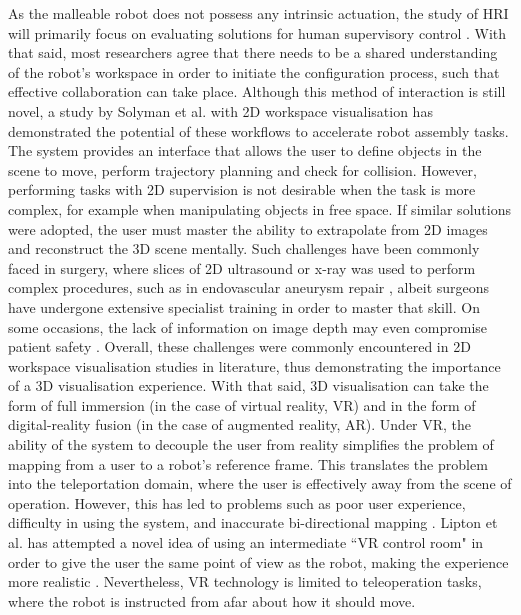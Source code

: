 As the malleable robot does not possess any intrinsic actuation, the study of HRI will primarily focus on evaluating solutions for human supervisory control \cite{sheridan2016human}. With that said, most researchers agree that there needs to be a shared understanding of the robot's workspace in order to initiate the configuration process, such that effective collaboration can take place. Although this method of interaction is still novel, a study by Solyman et al. \cite{solyman2020perceptive} with 2D workspace visualisation has demonstrated the potential of these workflows to accelerate robot assembly tasks. The system provides an interface that allows the user to define objects in the scene to move, perform trajectory planning and check for collision.  However, performing tasks with 2D supervision is not desirable when the task is more complex, for example when manipulating objects in free space. If similar solutions were adopted, the user must master the ability to extrapolate from 2D images and reconstruct the 3D scene mentally. Such challenges have been commonly faced in surgery, where slices of 2D ultrasound or x-ray was used to perform complex procedures, such as in endovascular aneurysm repair \cite{doelare2021image}, albeit surgeons have undergone extensive specialist training in order to master that skill. On some occasions, the lack of information on image depth may even compromise patient safety \cite{ma2017augmented}. Overall, these challenges were commonly encountered in 2D workspace visualisation studies in literature, thus demonstrating the importance of a 3D visualisation experience.
With that said, 3D visualisation can take the form of full immersion (in the case of virtual reality, VR) and in the form of digital-reality fusion (in the case of augmented reality, AR). Under VR, the ability of the system to decouple the user from reality simplifies the problem of mapping from a user to a robot's reference frame. This translates the problem into the teleportation domain, where the user is effectively away from the scene of operation. However, this has led to problems such as poor user experience, difficulty in using the system, and inaccurate bi-directional mapping \cite{mine1997moving}. Lipton et al. has attempted a novel idea of using an intermediate ``VR control room" in order to give the user the same point of view as the robot, making the experience more realistic \cite{lipton2017baxter}. Nevertheless, VR technology is limited to teleoperation tasks, where the robot is instructed from afar about how it should move.
